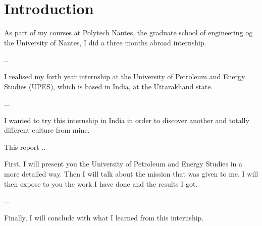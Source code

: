 \chapter{Introduction}

As part of my courses at Polytech Nantes, the graduate school of engineering og the University of Nantes, I did a three months abroad internship. 

..

I realised my forth year internship at the University of Petroleum and Energy Studies (UPES), which is based in India, at the Uttarakhand state.

...

I wanted to try this internship in India in order to discover another and totally different culture from mine. 

This report ..

First, I will present you the University of Petroleum and Energy Studies in a more detailed way. Then I will talk about the mission that was given to me. I will then expose to you the work I have done and the results I got. 

...

Finally, I will conclude with what I learned from this internship.
